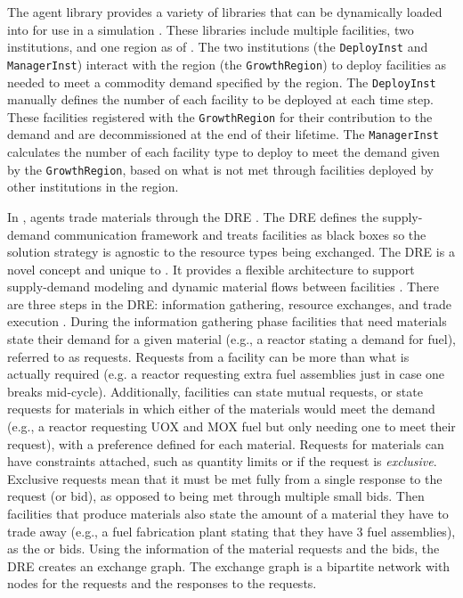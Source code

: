 The \Cycamore agent library provides a variety of libraries that can be 
dynamically loaded into \Cyclus for use in a simulation 
\cite{huff_fundamental_2016,carlsen_cycamore_2014}. These libraries 
include multiple facilities, two institutions, and one region as of 
 \cite{huff_fundamental_2016}. The two institutions 
(the \texttt{DeployInst} and \texttt{ManagerInst}) interact 
with the region (the \texttt{GrowthRegion}) to deploy 
facilities as needed to meet a commodity demand specified by the region. 
The \texttt{DeployInst} manually defines the number of each 
facility to be deployed at each time step. These facilities 
registered with the \texttt{GrowthRegion} for their 
contribution to the demand and are decommissioned at the end of their 
lifetime. The 
\texttt{ManagerInst} calculates the number of each facility 
type to deploy to meet the demand given by the \texttt{GrowthRegion}, 
based on what is not met through facilities deployed by other institutions 
in the region.  

In \Cyclus, agents trade materials through the \gls{DRE} 
\cite{gidden_agent-based_2015,huff_fundamental_2016}. The \gls{DRE} defines the 
supply-demand communication framework and treats facilities as black boxes
so the solution strategy is agnostic to the resource types being exchanged. 
The \gls{DRE} is a novel concept and unique to \Cyclus. It provides a 
flexible architecture to support supply-demand modeling and dynamic 
material flows between facilities \cite{huff_fundamental_2016}. 
There are three steps in the \gls{DRE}: information gathering, resource 
exchanges, and trade execution \cite{gidden_agent-based_2015}. 
During the information gathering 
phase facilities that need materials state their demand for a given 
material (e.g., a reactor stating a demand for fuel), referred to 
as requests. Requests 
from a facility can be more than what is actually required (e.g. a reactor
requesting extra fuel assemblies just in case one breaks mid-cycle). Additionally, 
facilities can state mutual requests, or state requests for materials in 
which either of the materials would meet the demand (e.g., a reactor 
requesting UOX and MOX fuel but only needing one to meet their request), with 
a preference defined for each material. Requests for materials can have 
constraints attached, such as quantity limits or if the request is 
\textit{exclusive}. Exclusive requests mean that it must be met fully 
from a single response to the request (or bid), as opposed to being met 
through multiple small 
bids. Then facilities that produce materials also state the amount of a 
material they have to trade away (e.g., a fuel fabrication plant stating 
that they have 3 fuel assemblies), as the or 
bids. Using the information of the material requests and the bids, 
the \gls{DRE} creates an exchange graph. The exchange graph is a 
bipartite network \cite{gidden_agent-based_2015}
with nodes for the requests and the responses to the requests. 

